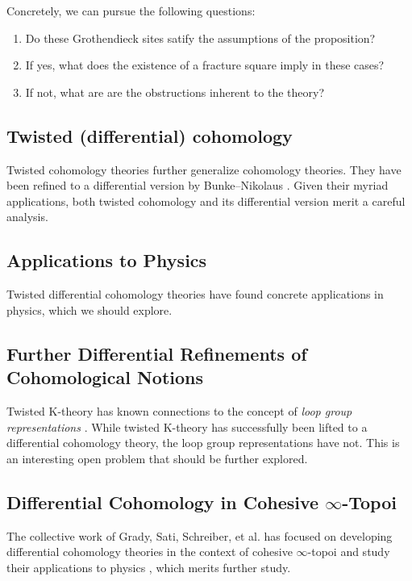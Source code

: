 \documentclass[a4paper]{book}
\theoremstyle{definition}
\theoremstyle{remark}
\numberwithin{equation}{section}
\begin{document}
Concretely, we can pursue the following questions:
\begin{enumerate}
  \item Do these Grothendieck sites satify the assumptions of the proposition?
  \item If yes, what does the existence of a fracture square imply in these cases?
  \item If not, what are are the obstructions inherent to the theory?
\end{enumerate}

\subsection{Twisted (differential) cohomology}
Twisted cohomology theories further generalize cohomology theories. They have been refined to a differential version by Bunke--Nikolaus \cite{bunkenikolaus2019twisted}. Given their myriad applications, both twisted cohomology and its differential version merit a careful analysis.

\subsection{Applications to Physics}
Twisted differential cohomology theories have found concrete applications in physics, which we should explore.

\subsection{Further Differential Refinements of Cohomological Notions}
Twisted K-theory has known connections to the concept of \emph{loop group representations} \cite{freedhopkinsteleman2011loopgroupsi}. While twisted K-theory has successfully been lifted to a differential cohomology theory, the loop group representations have not. This is an interesting open problem that should be further explored.


\subsection{Differential Cohomology in Cohesive \texorpdfstring{$\infty$}{oo}-Topoi}
The collective work of Grady, Sati, Schreiber, et al. has focused on developing differential cohomology theories in the context of cohesive $\infty$-topoi and study their applications to physics \cite{schreiber2013cohesive,fiorenzasatischreiber2024charactermap}, which merits further study.
\end{document}
